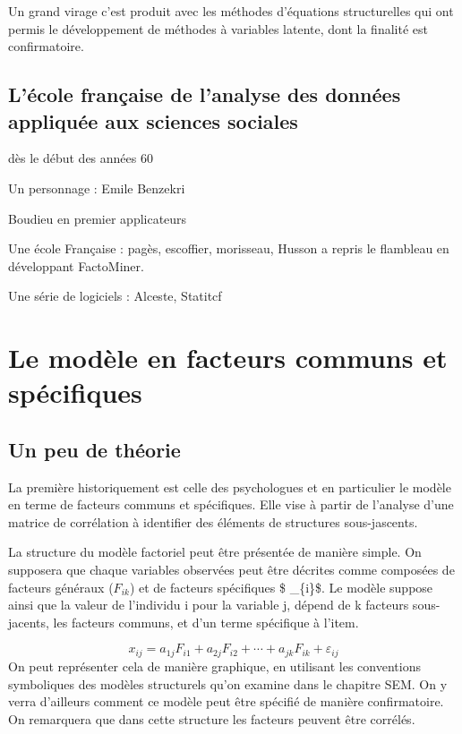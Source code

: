 \documentclass[
]{book}
\begin{document}
Un grand virage c'est produit avec les méthodes d'équations structurelles qui ont permis le développement de méthodes à variables latente, dont la finalité est confirmatoire.

\hypertarget{luxe9cole-franuxe7aise-de-lanalyse-des-donnuxe9es-appliquuxe9e-aux-sciences-sociales}{%
\subsection{L'école française de l'analyse des données appliquée aux sciences sociales}\label{luxe9cole-franuxe7aise-de-lanalyse-des-donnuxe9es-appliquuxe9e-aux-sciences-sociales}}

dès le début des années 60

Un personnage : Emile Benzekri

Boudieu en premier applicateurs

Une école Française : pagès, escoffier, morisseau, Husson a repris le flambleau en développant FactoMiner.

Une série de logiciels : Alceste, Statitcf

\hypertarget{le-moduxe8le-en-facteurs-communs-et-spuxe9cifiques}{%
\section{Le modèle en facteurs communs et spécifiques}\label{le-moduxe8le-en-facteurs-communs-et-spuxe9cifiques}}

\hypertarget{un-peu-de-thuxe9orie}{%
\subsection{Un peu de théorie}\label{un-peu-de-thuxe9orie}}

La première historiquement est celle des psychologues et en particulier le modèle en terme de facteurs communs et spécifiques. Elle vise à partir de l'analyse d'une matrice de corrélation à identifier des éléments de structures sous-jascents.

La structure du modèle factoriel peut être présentée de manière simple. On supposera que chaque variables observées peut être décrites comme composées de facteurs généraux (\(F_{ik}\)) et de facteurs spécifiques \$ \varepsilon\_\{i\}\$. Le modèle suppose ainsi que la valeur de l'individu i pour la variable j, dépend de k facteurs sous-jacents, les facteurs communs, et d'un terme spécifique à l'item.

\[x_{ij}= a_{1j}F_{i1} + a_{2j}F_{i2} + \cdots + a_{jk}F_{ik}+\varepsilon_{ij}\]
On peut représenter cela de manière graphique, en utilisant les conventions symboliques des modèles structurels qu'on examine dans le chapitre SEM. On y verra d'ailleurs comment ce modèle peut être spécifié de manière confirmatoire. On remarquera que dans cette structure les facteurs peuvent être corrélés.
\end{document}
